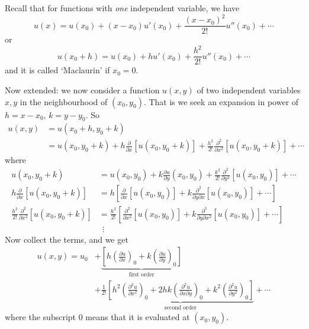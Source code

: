 \documentclass[12pt]{report}
\theoremstyle{definition}
\begin{document}
Recall that for functions with \emph{one} independent variable, we have\[
    u(x) = u(x_0) + (x-x_0)u'(x_0) + \frac{{(x-x_0)}^{2}}{2!}u''(x_0) +\cdots
\]or\[
u(x_0 + h) = u(x_0) + hu'(x_0) + \frac{h^{2}}{2!}u''(x_0) +\cdots
\]and it is called `Maclaurin' if $x_0 = 0$.

Now extended: we now consider a function $u(x,y)$ of two independent variables $x,y$
in the neighbourhood of $(x_0,y_0)$. That is we seek an expansion in power of $h = x-x_0$,
$k = y-y_0$. So\[
    \begin{align*}
        u(x,y) & = u(x_0 + h, y_0 + k) \\
               & = u(x_0, y_0 + k) + h\frac{\partial}{\partial x} [u(x_0, y_0 + k)]
               + \frac{h^{2}}{2!} \frac{\partial^{2}}{\partial x^{2}} [u(x_0, y_0 + k)] + \cdots
    \end{align*}
\]where\[
    \begin{align*}
        u(x_0, y_0 + k) & = u(x_0, y_0) + k\frac{\partial u}{\partial y} (x_0, y_0)
        + \frac{k^{2}}{2!}\frac{\partial^{2}}{\partial y^{2}} [u(x_0, y_0)] + \cdots \\
        h\frac{\partial}{\partial x} [u(x_0, y_0 + k)]
                        & = h\left[\frac{\partial}{\partial x} [u(x_0, y_0)]
                        + k\frac{\partial^{2}}{\partial y \partial x} [u(x_0, y_0)] + \cdots\right] \\
        \frac{h^{2}}{2!} \frac{\partial^{2}}{\partial x^{2}} [u(x_0, y_0 + k)]
                        & = \frac{h^{2}}{2!}\left[\frac{\partial^{2}}{\partial x^{2}} [u(x_0, y_0)]
                        + k\frac{\partial^{3}}{\partial y \partial x^{2}} [u(x_0, y_0)] + \cdots\right] \\
                        & \;\,\vdots
    \end{align*}
\]Now collect the terms, and we get\[
\begin{align*}
u(x,y) = u_0 
& + \underbrace{\left[h{\left(\frac{\partial u}{\partial x} \right)}_{0}
+ k{\left(\frac{\partial u}{\partial y} \right)}_{0}\right]}_\text{first order} \\
& + \frac{1}{2!}\underbrace{\left[h^{2}{\left(\frac{\partial^{2}u}{\partial x^{2}} \right)}_{0}
+ 2hk{\left(\frac{\partial^{2}u}{\partial x \partial y} \right)}_{0}
+ k^{2}{\left(\frac{\partial^{2}u}{\partial y^{2}} \right)}_{0}\right]}_\text{second order} + \cdots
\end{align*}
\]where the subscript $0$ means that it is evaluated at $(x_0, y_0)$.
\end{document}
